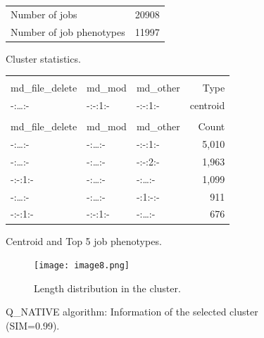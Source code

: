 \documentclass{jhps}
\begin{document}
\begin{figure}
	\begin{subtable}{\textwidth}
		\centering
		\begin{tabular}{ll}
			Number of jobs & 20908 \\
			Number of job phenotypes & 11997 \\
		\end{tabular}
		\caption{Cluster statistics.}
		\label{cluster:hex_native:stats}
	\end{subtable}
	\medskip
	\begin{subtable}{\textwidth}
		\centering
		\begin{tiny}
			\begin{tabular}{lll|r}
				\rowcolor{tblhead}
				\multicolumn{3}{l|}{Q-coding} &            \\
				\rowcolor{tblhead}
				md\_file\_delete     &  md\_mod   & md\_other & Type     \\
				\hline
				-:\dots:-            &  -:-:1:-   & -:-:1:-   & centroid \\
				\multicolumn{4}{l}{} \\
				\rowcolor{tblhead}
				md\_file\_delete     &  md\_mod   & md\_other & Count    \\
				\hline
				-:\dots:-            &  -:\dots:- & -:-:1:-   & 5,010    \\
				-:\dots:-            &  -:\dots:- & -:-:2:-   & 1,963    \\
				-:-:1:-              &  -:\dots:- & -:\dots:- & 1,099    \\
				-:\dots:-            &  -:\dots:- & -:1:-:-   & 911      \\
				-:-:1:-              &  -:-:1:-   & -:\dots:- & 676      \\
			\end{tabular}
		\end{tiny}
		\caption{Centroid and Top 5 job phenotypes.}
		\label{cluster:hex_native:top_jobs}
	\end{subtable}
	\medskip
	\begin{subfigure}{\textwidth}
		\centering
		\texttt{[image: image8.png]}
		\caption{Length distribution in the cluster.}
		\label{cluster:hex_native:length}
	\end{subfigure}
	\caption{Q\_NATIVE algorithm: Information of the selected cluster (SIM=0.99).}
	\label{cluster:hex_native}
\end{figure}

\FloatBarrier
\end{document}
